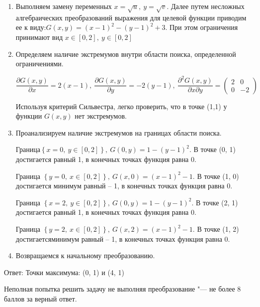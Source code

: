 \documentclass[addpoints]{exam} %
\begin{document}
\begin{questions}
\begin{solution}
  \begin{enumerate}
  \item  Выполняем замену переменных $x=\sqrt{u},\ y=\sqrt{v}$. Далее путем несложных алгебраических преобразований выражения для целевой функции приводим ее к виду:$G\left(x,y\right)={\left(x-1\right)}^2-{\left(y-1\right)}^2+3$. При этом ограничения принимают вид $x\in \left[0,2\right],\ y\in \left[0,2\right]$

  \item  Определяем наличие экстремумов внутри области поиска, определенной ограничениями.

  \[\frac{\partial G\left(x,y\right)}{\partial x}=2\left(x-1\right),\ \frac{\partial G\left(x,y\right)}{\partial y}=-2\left(y-1\right),\ \frac{{\partial }^2G\left(x,y\right)}{\partial x\partial y}=\left( \begin{array}{cc}
  2 & 0 \\
  0 & -2 \end{array}
  \right)\]


Используя критерий Сильвестра, легко проверить, что в точке (1,1) у функции $G(x,y)$ нет экстремумов.

\item  Проанализируем наличие экстремумов на границах области поиска.

Граница$\left\{x=0,\ y\in \left[0,2\right]\right\},\ G\left(0,y\right)=1-{\left(y-1\right)}^2$. В точке (0, 1) достигается \textbf{} равный 1, в конечных точках функция равна 0.

Граница $\left\{y=0,\ x\in \left[0,2\right]\right\},\ G\left(x,0\right)={\left(x-1\right)}^2-1$. В точке (1, 0) достигается минимум равный -- 1, в конечных точках функция равна 0.

Граница $\left\{x=2,\ y\in \left[0,2\right]\right\},\ G\left(0,y\right)=1-{\left(y-1\right)}^2$. В точке (2, 1) достигается \textbf{} равный 1, в конечных точках функция равна 0.

Граница $\left\{y=2,\ x\in \left[0,2\right]\right\},\ G\left(x,2\right)={\left(x-1\right)}^2-1$. В точке (1, 2) достигаетсяминимум равный -- 1, в конечных точках функция равна 0.

\item  Возвращаемся к начальному преобразованию.
\end{enumerate}

Ответ: Точки максимума: (0, 1) и (4, 1)

Неполная попытка решить задачу не выполняя преобразование "--- не более 8 баллов за верный ответ.


\end{solution}
\end{questions}
\end{document}
